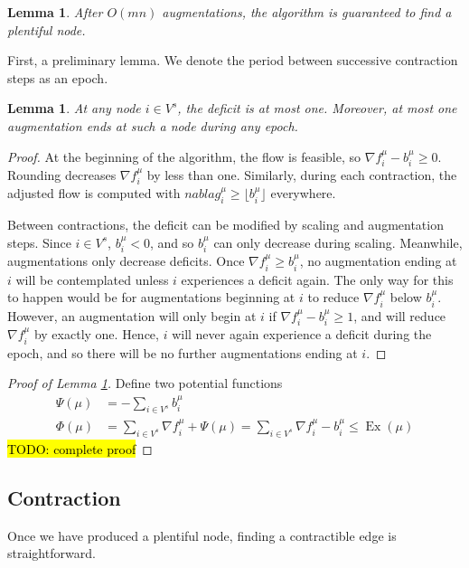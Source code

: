 \documentclass[11pt]{article}
\newtheorem{lemma}[theorem]{Lemma}
\theoremstyle{definition}
\theoremstyle{definition}
\newcommand{\fu}{f^{\mu}}
\newcommand{\nfiu}{\nabla \fu_i}
\newcommand{\biu}{b_{i}^{\mu}}
\newcommand{\vsrc}{V^{s}}
\DeclareMathOperator{\Ex}{Ex}
\newcommand{\todo}[1]{\hl{TODO: #1}}
\begin{document}
		\begin{lemma} \label{lem.num-aug}
			After $O(mn)$ augmentations, the algorithm is guaranteed to find a plentiful node.
		\end{lemma}
		First, a preliminary lemma. We denote the period between successive contraction
		steps as an epoch.
		\begin{lemma}
		At any node $i \in \vsrc$, the deficit is at most one. Moreover, at most one augmentation
		ends at such a node during any epoch.
		\end{lemma}
		\begin{proof}
			At the beginning of the algorithm, the flow is feasible, so $\nfiu - \biu \geq 0$.
			Rounding decreases $\nfiu$ by less than one. Similarly, during each contraction,
			the adjusted flow is computed with $nabla g_i^\mu \geq \lfloor \biu \rfloor$ everywhere.
			
			Between contractions, the deficit can be modified by scaling and augmentation steps.
			Since $i \in \vsrc$, $\biu < 0$, and so $\biu$ can only decrease during scaling.
			Meanwhile, augmentations only decrease deficits.
			Once $\nfiu \geq \biu$, no augmentation ending at $i$ will be contemplated unless $i$
			experiences a deficit again. The only way for this to happen would be for
			augmentations beginning at $i$ to reduce $\nfiu$ below $\biu$. However,
			an augmentation will only begin at $i$ if
			$\nfiu - \biu \geq 1$, and will reduce $\nfiu$ by exactly one. Hence, $i$ will
			never again experience a deficit during the epoch, and so there will be no further
			augmentations ending at $i$.
		\end{proof}
		
		\begin{proof}[Proof of Lemma \ref{lem.num-aug}]
		Define two potential functions
		\begin{align*}
		\Psi(\mu) &= - \sum_{i \in \vsrc} \biu \\
		\Phi(\mu) &= \sum_{i \in \vsrc} \nfiu + \Psi(\mu) = \sum_{i \in \vsrc} \nfiu - \biu
		           \leq \Ex(\mu)
		\end{align*}
		\todo{complete proof}
		\end{proof}


	\subsection{Contraction}

	Once we have produced a plentiful node, finding a contractible edge is straightforward. 
\end{document}
